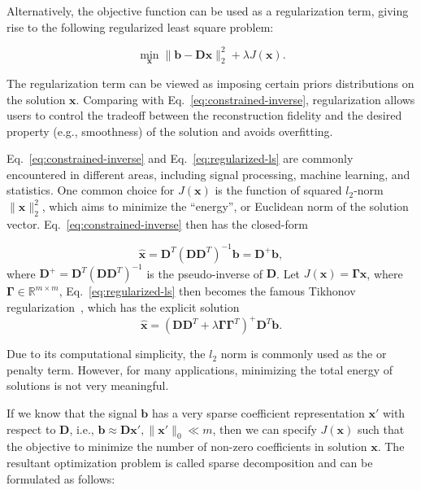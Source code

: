 Alternatively, the objective function can be used as a regularization term, giving rise to
the following regularized least square problem:

\begin{equation}
\label{eq:regularized-ls}
\min_\mathbf{x} \|\mathbf{b}-\mathbf{D}\mathbf{x}\|_2^2 + \lambda J(\mathbf{x}).
\end{equation}

The regularization term can be viewed as imposing certain priors distributions on
the solution $\mathbf{x}$. Comparing with Eq.~\ref{eq:constrained-inverse}, regularization
allows users to control the tradeoff between the reconstruction fidelity and the
desired property (e.g., smoothness) of the solution and avoids overfitting.

Eq.~\ref{eq:constrained-inverse} and Eq.~\ref{eq:regularized-ls} are commonly encountered in different
areas, including signal processing, machine learning, and statistics. One common choice for $J(\mathbf{x})$
is the function of squared $l_2$-norm $\|\mathbf{x}\|_2^2$, which aims to minimize the ``energy'', or Euclidean
norm of the solution vector. Eq.~\ref{eq:constrained-inverse} then has the closed-form

\begin{equation}
\hat{\mathbf{x}}=\mathbf{D}^T(\mathbf{D}\mathbf{D}^T)^{-1}\mathbf{b}=\mathbf{D}^{+}\mathbf{b},
\end{equation}
where $\mathbf{D}^{+}=\mathbf{D}^T(\mathbf{D}\mathbf{D}^T)^{-1}$ is the pseudo-inverse
of $\mathbf{D}$. Let $J(\mathbf{x})=\mathbf{\Gamma}\mathbf{x}$, where $\mathbf{\Gamma}\in\mathbb{R}^{m\times m}$,
Eq.~\ref{eq:regularized-ls} then becomes the famous Tikhonov regularization~\cite{Golub1999}, which has the
explicit solution
\begin{equation}
\hat{\mathbf{x}} = (\mathbf{D}\mathbf{D}^T + \lambda \mathbf{\Gamma}\mathbf{\Gamma}^T)^{+}\mathbf{D}^T\mathbf{b}.
\end{equation}

Due to its computational simplicity, the $l_2$ norm is commonly used as the or penalty term. However, for
many applications, minimizing the total energy of solutions is not very meaningful.

If we know that the signal $\mathbf{b}$ has a very sparse coefficient representation $\mathbf{x'}$ with respect
to $\mathbf{D}$, i.e., $ \mathbf{b} \approx \mathbf{D}\mathbf{x'}, \|\mathbf{x'}\|_0 \ll m$,
then we can specify $J(\mathbf{x})$ such that the objective to minimize the number of non-zero coefficients
in solution $\mathbf{x}$. The resultant optimization problem is called sparse decomposition and can be
formulated as follows:

